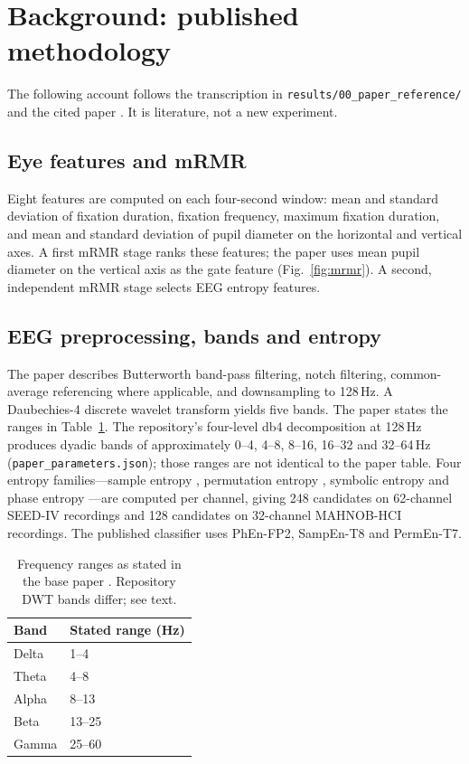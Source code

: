 \section{Background: published methodology}
The following account follows the transcription in \texttt{results/00\_paper\_reference/} and the cited paper \cite{FarhadiSedehi2024a}. It is literature, not a new experiment.

\subsection{Eye features and mRMR}
Eight features are computed on each four-second window: mean and standard deviation of fixation duration, fixation frequency, maximum fixation duration, and mean and standard deviation of pupil diameter on the horizontal and vertical axes. A first mRMR stage \cite{Peng2005} ranks these features; the paper uses mean pupil diameter on the vertical axis as the gate feature (Fig.~\ref{fig:mrmr}). A second, independent mRMR stage selects EEG entropy features.

\subsection{EEG preprocessing, bands and entropy}
The paper describes Butterworth band-pass filtering, notch filtering, common-average referencing where applicable, and downsampling to 128\,Hz. A Daubechies-4 discrete wavelet transform \cite{Mallat1989} yields five bands. The paper states the ranges in Table~\ref{tab:bands}. The repository's four-level db4 decomposition at 128\,Hz produces dyadic bands of approximately 0--4, 4--8, 8--16, 16--32 and 32--64\,Hz (\texttt{paper\_parameters.json}); those ranges are not identical to the paper table. Four entropy families---sample entropy \cite{Richman2000}, permutation entropy \cite{Bandt2002}, symbolic entropy \cite{Zebrowski2000} and phase entropy \cite{Rohila2019}---are computed per channel, giving 248 candidates on 62-channel SEED-IV recordings and 128 candidates on 32-channel MAHNOB-HCI recordings. The published classifier uses PhEn-FP2, SampEn-T8 and PermEn-T7.

\begin{table}[t]
\centering
\caption{Frequency ranges as stated in the base paper \cite{FarhadiSedehi2024a}. Repository DWT bands differ; see text.}
\label{tab:bands}
\begin{tabular}{ll}
\toprule
Band & Stated range (Hz) \\
\midrule
Delta & 1--4 \\
Theta & 4--8 \\
Alpha & 8--13 \\
Beta & 13--25 \\
Gamma & 25--60 \\
\bottomrule
\end{tabular}
\end{table}

